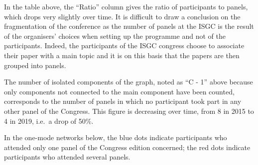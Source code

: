 \documentclass[
]{article}
\begin{document}
In the table above, the ``Ratio'' column gives the ratio of participants
to panels, which drops very slightly over time. It is difficult to draw
a conclusion on the fragmentation of the conference as the number of
panels at the ISGC is the result of the organisers' choices when setting
up the programme and not of the participants. Indeed, the participants
of the ISGC congress choose to associate their paper with a main topic
and it is on this basis that the papers are then grouped into panels.

The number of isolated components of the graph, noted as ``C - 1'' above
because only components not connected to the main component have been
counted, corresponds to the number of panels in which no participant
took part in any other panel of the Congress. This figure is decreasing
over time, from 8 in 2015 to 4 in 2019, i.e.~a drop of 50\%.

In the one-mode networks below, the blue dots indicate participants who
attended only one panel of the Congress edition concerned; the red dots
indicate participants who attended several panels.
\end{document}

